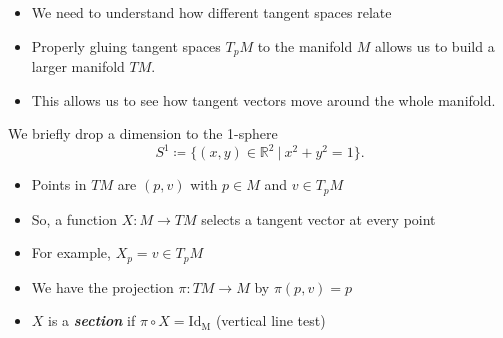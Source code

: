 \documentclass[UKenglish]{beamer}
\newcommand\boldgreen[1]{\textcolor{lighter_csu_green}{\emph{\textbf{#1}}}}
\newcommand{\R}{\mathbb{R}}
\begin{document}
\begin{frame}{}
\vfill
\begin{figure}[H]
	\centering
	\def\svgwidth{\columnwidth}
	
\end{figure}
\vfill
\end{frame}

\begin{frame}{}
	\vfill
	\begin{itemize}
		\item We need to understand how different tangent spaces relate
		\pause
		\item Properly gluing tangent spaces $T_pM$ to the manifold $M$ allows us to build a larger manifold $TM$.
		\pause
		\item This allows us to see how tangent vectors move around the whole manifold.
	\end{itemize}
	\vfill
\end{frame}

\begin{frame}{}
	\vfill
	We briefly drop a dimension to the 1-sphere
	\[
	S^1 \coloneqq \{ (x,y)\in \R^2 ~\vert~ x^2+y^2 = 1\}.
	\]
	\vfill
\end{frame}

\begin{frame}{}
\vfill
\begin{figure}[H]
	\centering
	\def\svgwidth{.75\columnwidth}
	
\end{figure}
\vfill
\end{frame}

\begin{frame}{}
\vfill
\begin{figure}[H]
	\centering
	\def\svgwidth{\columnwidth}
	
\end{figure}
\vfill
\end{frame}

\begin{frame}{}
	\vfill
	\begin{itemize}
		\item Points in $TM$ are $(p,v)$ with $p\in M$ and $v\in T_pM$
		\pause
		\item So, a function $X \colon M \to TM$ selects a tangent vector at every point
		\pause
		\item For example, $X_p = v \in T_pM$
		\pause
		\item We have the projection $\pi \colon TM \to M$ by $\pi(p,v)=p$
		\pause
		\item $X$ is a \boldgreen{section} if $\pi \circ X = \mathrm{Id_M}$ (vertical line test)
	\end{itemize}
\end{frame}
\end{document}
